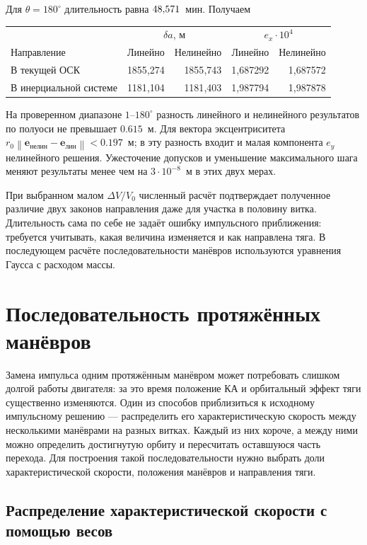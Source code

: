 \documentclass[a4paper,11pt]{article}
\newcommand{\vect}[1]{\boldsymbol{#1}}
\newcommand{\norm}[1]{\left\lVert#1\right\rVert}
\numberwithin{equation}{section}
\begin{document}
Для $\theta=180^\circ$ длительность равна
$48{,}571$~мин. Получаем
\begin{center}
\renewcommand{\arraystretch}{1.15}
\begin{tabular}{@{}lrrrr@{}}
\toprule
&\multicolumn{2}{c}{$\delta a$, м}
&\multicolumn{2}{c}{$e_x\cdot10^4$}\\
Направление&Линейно&Нелинейно&Линейно&Нелинейно\\\midrule
В текущей ОСК&1855{,}274&1855{,}743&1{,}687292&1{,}687572\\
В инерциальной системе&1181{,}104&1181{,}403&1{,}987794&1{,}987878\\
\bottomrule
\end{tabular}
\end{center}
На проверенном диапазоне $1$--$180^\circ$ разность линейного
и нелинейного результатов по полуоси не превышает $0.615$~м.
Для вектора эксцентриситета
$r_0\norm{\vect e_{\text{нелин}}-\vect e_{\text{лин}}}<0.197$~м;
в эту разность входит и малая компонента $e_y$
нелинейного решения. Ужесточение допусков и уменьшение
максимального шага меняют результаты менее чем на
$3\cdot10^{-8}$~м в этих двух мерах.

При выбранном малом $\Delta V/V_0$ численный расчёт подтверждает
полученное различие двух законов направления даже для участка
в половину витка. Длительность сама по себе не задаёт ошибку
импульсного приближения: требуется учитывать, какая величина
изменяется и как направлена тяга. В последующем расчёте последовательности манёвров используются
уравнения Гаусса с расходом массы.

\FloatBarrier
\FloatBarrier
\section{Последовательность протяжённых манёвров}
\label{sec:sequence}

Замена импульса одним протяжённым манёвром может потребовать
слишком долгой работы двигателя: за это время положение КА
и орбитальный эффект тяги существенно изменяются. Один из способов
приблизиться к исходному импульсному решению --- распределить
его характеристическую скорость между несколькими манёврами
на разных витках. Каждый из них короче, а между ними можно
определить достигнутую орбиту и пересчитать оставшуюся часть перехода.
Для построения такой последовательности нужно выбрать доли
характеристической скорости, положения манёвров и направления тяги.

\subsection{Распределение характеристической скорости с помощью весов}
\end{document}
